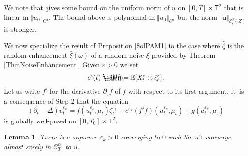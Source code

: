 \documentclass[10pt]{amsart}
\makeatletter
\newtheorem{lem}[thm]{Lemma}
\theoremstyle{definition}
\let\epsilon\varepsilon
\newcommand\bbE{\mathbb{E}}
\newcommand{\mcE}{\mathcal{E}}
\newcommand{\bsu}{\boldsymbol{u}}
\newcommand{\scrC}{\ensuremath{\mathscr{C}}}
\newcommand*{\defeq}{\mathrel{\rlap{%
\raisebox{0.3ex}{$\m@th\cdot$}}%
\raisebox{-0.3ex}{$\m@th\cdot$}}%
=}
\makeatother
\begin{document}
We note that \cite{CFW} gives some bound on the uniform norm of $u$ on $[0,T]\times \mathsf{T}^2$ that is linear in $\Vert u_0\Vert_{C^\alpha}$. The bound above is polynomial in $\Vert u_0\Vert_{C^\alpha}$ but the norm $\Vert \bsu\Vert_{\mcE_T^\beta(Z)}$ is stronger.

We now specialize the result of Proposition \ref{SolPAM1} to the case where $\widehat\zeta$ is the random enhancement $\widehat\xi(\omega)$ of a random noise $\xi$ provided by Theorem \ref{ThmNoiseEnhancement}. Given $\epsilon>0$ we set
\[
c^\epsilon(t) \defeq \bbE[X^{\epsilon}_t \odot \xi^{\epsilon}_t].
\]
Let us write $f'$ for the derivative $\partial_1f$ of $f$ with respect to its first argument. It~is a consequence of Step 2 that the equation
\begin{equation} \label{EqRenormalizedEqMuFixed}
(\partial_t - \Delta) u^{\epsilon_k}_t = f(u^{\epsilon_k}_t,\mu_t)\zeta^{\epsilon_k}_t - c^{\epsilon_k} (f'f)(u^{\epsilon_k}_t, \mu_t) + g(u^{\epsilon_k}_t,\mu_t)
\end{equation}
is globally well-posed on $[0,T_0]\times \mathsf{T}^2$.

\begin{lem} \label{LemASconvergenceSubsequence}
There is a sequence $\epsilon_k>0$ converging to $0$ such the $u^{\epsilon_k}$ converge almost surely in $\scrC^\alpha_{T_0}$ to $u$.
\end{lem}
\end{document}

